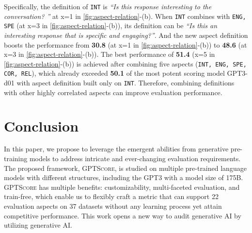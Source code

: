 Specifically, the definition of \texttt{INT} is \textit{``Is this response interesting to the conversation? ''} at x=1 in \autoref{fig:aspect-relation}-(b).
When \texttt{INT} combines with \texttt{ENG, SPE} (at x=3 in \autoref{fig:aspect-relation}-(b)), its definition can be \textit{``Is this an interesting response that is specific and engaging?''}. And the new aspect definition boosts the performance from \textbf{30.8} (at x=1 in \autoref{fig:aspect-relation}-(b)) to \textbf{48.6} (at x=3 in \autoref{fig:aspect-relation}-(b)). 
The best performance of \textbf{51.4} (x=5 in \autoref{fig:aspect-relation}-(b)) is achieved after combining five aspects (\texttt{INT, ENG, SPE, COR, REL}), which already exceeded \textbf{50.1} of the most potent scoring model GPT3-d01 with aspect definition built only on \texttt{INT}.
Therefore, combining definitions with other highly correlated aspects can improve evaluation performance.

\section{Conclusion}

In this paper, we propose to leverage the emergent abilities from generative pre-training models to address intricate and ever-changing evaluation requirements. The proposed framework, \textsc{GPTScore}, is studied on multiple pre-trained language models with different structures, including the GPT3 with a model size of 175B.
\textsc{GPTScore} has multiple benefits: customizability, multi-faceted evaluation, and train-free, which enable us to flexibly craft a metric that can support 22 evaluation aspects on 37 datasets without any learning process yet attain competitive performance. This work opens a new way to audit generative AI by utilizing generative AI.


